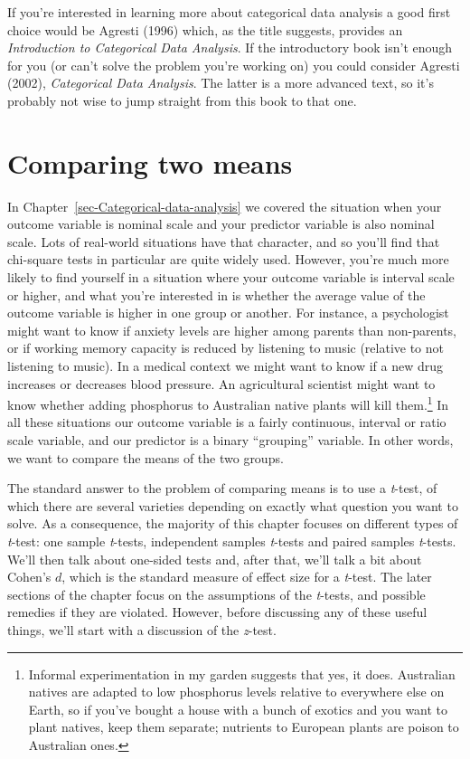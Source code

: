 \documentclass[
  a4paper,
]{book}
\begin{document}
If you're interested in learning more about categorical data analysis a
good first choice would be Agresti (1996) which, as the title suggests,
provides an \emph{Introduction to Categorical Data Analysis}. If the
introductory book isn't enough for you (or can't solve the problem
you're working on) you could consider Agresti (2002), \emph{Categorical
Data Analysis}. The latter is a more advanced text, so it's probably not
wise to jump straight from this book to that one.

\hypertarget{sec-Comparing-two-means}{%
\chapter{Comparing two means}\label{sec-Comparing-two-means}}

In Chapter~\ref{sec-Categorical-data-analysis} we covered the situation
when your outcome variable is nominal scale and your predictor variable
is also nominal scale. Lots of real-world situations have that
character, and so you'll find that chi-square tests in particular are
quite widely used. However, you're much more likely to find yourself in
a situation where your outcome variable is interval scale or higher, and
what you're interested in is whether the average value of the outcome
variable is higher in one group or another. For instance, a psychologist
might want to know if anxiety levels are higher among parents than
non-parents, or if working memory capacity is reduced by listening to
music (relative to not listening to music). In a medical context we
might want to know if a new drug increases or decreases blood pressure.
An agricultural scientist might want to know whether adding phosphorus
to Australian native plants will kill them.\footnote{Informal
  experimentation in my garden suggests that yes, it does. Australian
  natives are adapted to low phosphorus levels relative to everywhere
  else on Earth, so if you've bought a house with a bunch of exotics and
  you want to plant natives, keep them separate; nutrients to European
  plants are poison to Australian ones.} In all these situations our
outcome variable is a fairly continuous, interval or ratio scale
variable, and our predictor is a binary ``grouping'' variable. In other
words, we want to compare the means of the two groups.

The standard answer to the problem of comparing means is to use a
\emph{t}-test, of which there are several varieties depending on exactly
what question you want to solve. As a consequence, the majority of this
chapter focuses on different types of \emph{t}-test: one sample
\emph{t}-tests, independent samples \emph{t}-tests and paired samples
\emph{t}-tests. We'll then talk about one-sided tests and, after that,
we'll talk a bit about Cohen's \(d\), which is the standard measure of
effect size for a \emph{t}-test. The later sections of the chapter focus
on the assumptions of the \emph{t}-tests, and possible remedies if they
are violated. However, before discussing any of these useful things,
we'll start with a discussion of the \emph{z}-test.
\end{document}

